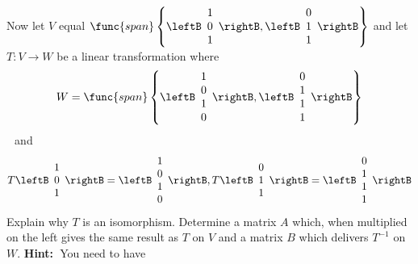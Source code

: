 \begin{enumialphparenastyle}
\begin{ex} Now let $V$ equal $\func{span}\left\{ \leftB 
\begin{array}{c}
1 \\ 
0 \\ 
1
\end{array}
\rightB ,\leftB 
\begin{array}{c}
0 \\ 
1 \\ 
1
\end{array}
\rightB \right\} $ and let $T:V\rightarrow W$ be a linear transformation
where 
\begin{equation*}
W=\func{span}\left\{ \leftB 
\begin{array}{c}
1 \\ 
0 \\ 
1 \\ 
0
\end{array}
\rightB ,\leftB 
\begin{array}{c}
0 \\ 
1 \\ 
1 \\ 
1
\end{array}
\rightB \right\}
\end{equation*}
$\ $\ and 
\begin{equation*}
T\leftB 
\begin{array}{c}
1 \\ 
0 \\ 
1
\end{array}
\rightB =\leftB 
\begin{array}{c}
1 \\ 
0 \\ 
1 \\ 
0
\end{array}
\rightB ,T\leftB 
\begin{array}{c}
0 \\ 
1 \\ 
1
\end{array}
\rightB =\leftB 
\begin{array}{c}
0 \\ 
1 \\ 
1 \\ 
1
\end{array}
\rightB 
\end{equation*}
Explain why $T$ is an isomorphism. Determine a matrix $A$ which, when
multiplied on the left gives the same result as $T$ on $V$ and a matrix $B$
which delivers $T^{-1}$ on $W$. \textbf{Hint:\ }You need to have 
\begin{equation*}

\end{equation*}
\end{ex}
\end{enumialphparenastyle}
